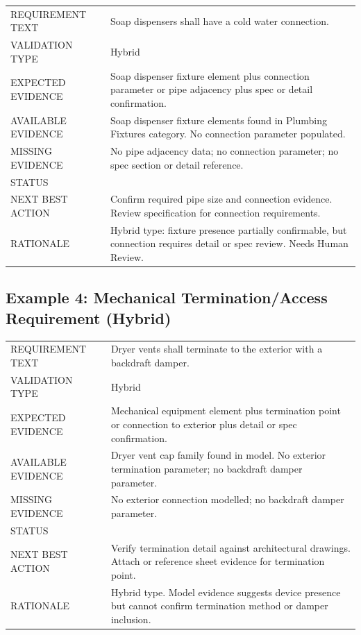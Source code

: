 \documentclass[10pt,letterpaper]{article}
\newcommand{\smalllabel}[1]{{\scriptsize\textcolor{emaMuted}{\MakeUppercase{#1}}}}
\newcommand{\badge}[3]{\tcbox[on line,colback=#2,colframe=#2,boxrule=0pt,
    arc=2mm,left=5pt,right=5pt,top=2pt,bottom=2pt]{\scriptsize\textbf{\textcolor{#3}{#1}}}}
\newcommand{\reviewbadge}{\badge{Needs Human Review}{emaAmberBg}{emaAmber}}
\begin{document}
\begin{tcolorbox}[colback=white]
\begin{tabularx}{\textwidth}{p{1.4in}p{4.8in}}
\toprule
\smalllabel{Requirement Text} & Soap dispensers shall have a cold water connection. \\
\smalllabel{Validation Type} & Hybrid \\
\smalllabel{Expected Evidence} & Soap dispenser fixture element plus connection parameter or pipe
  adjacency plus spec or detail confirmation. \\
\smalllabel{Available Evidence} & Soap dispenser fixture elements found in Plumbing Fixtures
  category. No connection parameter populated. \\
\smalllabel{Missing Evidence} & No pipe adjacency data; no connection parameter; no spec section or
  detail reference. \\
\smalllabel{Status} & \reviewbadge \\
\smalllabel{Next Best Action} & Confirm required pipe size and connection evidence. Review
  specification for connection requirements. \\
\smalllabel{Rationale} & Hybrid type: fixture presence partially confirmable, but connection requires
  detail or spec review. Needs Human Review. \\
\bottomrule
\end{tabularx}
\end{tcolorbox}

\subsection*{Example 4: Mechanical Termination/Access Requirement (Hybrid)}

\begin{tcolorbox}[colback=white]
\begin{tabularx}{\textwidth}{p{1.4in}p{4.8in}}
\toprule
\smalllabel{Requirement Text} & Dryer vents shall terminate to the exterior with a backdraft damper.
\\
\smalllabel{Validation Type} & Hybrid \\
\smalllabel{Expected Evidence} & Mechanical equipment element plus termination point or connection to
  exterior plus detail or spec confirmation. \\
\smalllabel{Available Evidence} & Dryer vent cap family found in model. No exterior termination
  parameter; no backdraft damper parameter. \\
\smalllabel{Missing Evidence} & No exterior connection modelled; no backdraft damper parameter. \\
\smalllabel{Status} & \reviewbadge \\
\smalllabel{Next Best Action} & Verify termination detail against architectural drawings. Attach or
  reference sheet evidence for termination point. \\
\smalllabel{Rationale} & Hybrid type. Model evidence suggests device presence but cannot confirm
  termination method or damper inclusion. \\
\bottomrule
\end{tabularx}
\end{tcolorbox}
\end{document}
